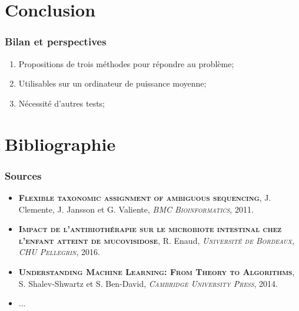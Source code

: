 \documentclass{beamer}
\begin{document}
\section{Conclusion}


\begin{frame}
\frametitle{Bilan et perspectives}

\begin{enumerate}
\item Propositions de trois méthodes pour répondre au problème;
\bigskip
\item Utilisables sur un ordinateur de puissance moyenne;
\bigskip
\item Nécessité d'autres tests;
\end{enumerate}

\end{frame}

\section{Bibliographie}
\begin{frame}
\frametitle{Sources}

\begin{itemize}
\item \textsc{ \bf Flexible taxonomic assignment of ambiguous sequencing}, J. Clemente, J. Jansson et G. Valiente, \textsc{ \it BMC Bioinformatics}, 2011.
\item \textsc{\bf Impact de l'antibiothérapie sur le microbiote intestinal chez l'enfant atteint de mucovisidose}, R. Enaud, \textsc{\it Université de Bordeaux, CHU Pellegrin}, 2016.
\item \textsc{\bf Understanding Machine Learning: From Theory to Algorithms}, S. Shalev-Shwartz et S. Ben-David, \textsc{\it Cambridge University Press}, 2014.
\item ...
\end{itemize}

\end{frame}
\end{document}
